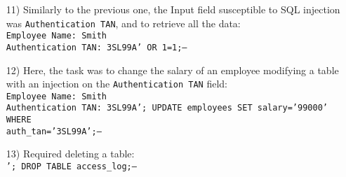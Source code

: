 \documentclass{article}
\begin{document}
\begin{itemize}
    \item[11)] {Similarly to the previous one, the Input field susceptible to SQL injection was \texttt{Authentication TAN}, and to retrieve all the data:\\
    \texttt{Employee Name: Smith\\Authentication TAN: 3SL99A' OR 1=1;--}}
    
    \item[12)] {Here, the task was to change the salary of an employee modifying a table with an injection on the \texttt{Authentication TAN} field:\\
    \texttt{Employee Name: Smith\\Authentication TAN: 3SL99A'; UPDATE employees SET salary='99000' WHERE \\auth\_tan='3SL99A';--}}
    
    \item[13)] {Required deleting a table:\\
    \texttt{'; DROP TABLE access\_log;--}}
\end{itemize}
\end{document}

